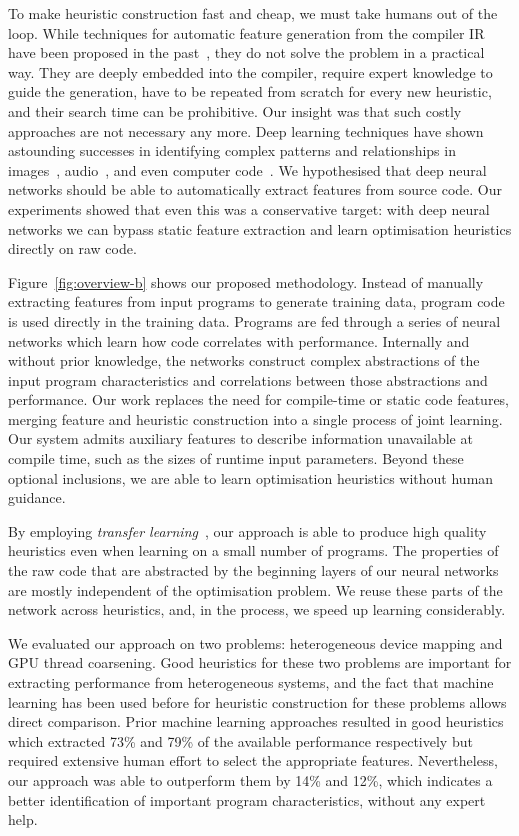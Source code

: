 To make heuristic construction fast and cheap, we must take humans out of the loop. While techniques for automatic feature generation from the compiler IR have been proposed in the past~\cite{Namolaru2010a,Leather2014}, they do not solve the problem in a practical way. They are deeply embedded into the compiler, require expert knowledge to guide the generation, have to be repeated from scratch for every new heuristic, and their search time can be prohibitive. Our insight was that such costly approaches are not necessary any more. Deep learning techniques have shown astounding successes in identifying complex patterns and relationships in images~\cite{Krizhevsky2012,He2016}, audio~\cite{Lee2009b}, and even computer code~\cite{Allamanis2014,Allamanis2014a}. We hypothesised that deep neural networks should be able to automatically extract features from source code. Our experiments showed that even this was a conservative target: with deep neural networks we can bypass static feature extraction and learn optimisation heuristics directly on raw code.



Figure~\ref{fig:overview-b} shows our proposed methodology. Instead of manually extracting features from input programs to generate training data, program code is used directly in the training data. Programs are fed through a series of neural networks which learn how code correlates with performance. Internally and without prior knowledge, the networks construct complex abstractions of the input program characteristics and correlations between those abstractions and performance. Our work replaces the need for compile-time or static code features, merging feature and heuristic construction into a single process of joint learning. Our system admits auxiliary features to describe information unavailable at compile time, such as the sizes of runtime input parameters. Beyond these optional inclusions, we are able to learn optimisation heuristics without human guidance.

By employing \emph{transfer learning}~\cite{Yosinski2014}, our approach is able to produce high quality heuristics even when learning on a small number of programs. The properties of the raw code that are abstracted by the beginning layers of our neural networks are mostly independent of the optimisation problem. We reuse these parts of the network across heuristics, and, in the process, we speed up learning considerably.

We evaluated our approach on two problems: heterogeneous device mapping and GPU thread coarsening. Good heuristics for these two problems are important for extracting performance from heterogeneous systems, and the fact that machine learning has been used before for heuristic construction for these problems allows direct comparison. Prior machine learning approaches resulted in good heuristics which extracted 73\% and 79\% of the available performance respectively but required extensive human effort to select the appropriate features. Nevertheless, our approach was able to outperform them by 14\% and 12\%, which indicates a better identification of important program characteristics, without any expert help.
